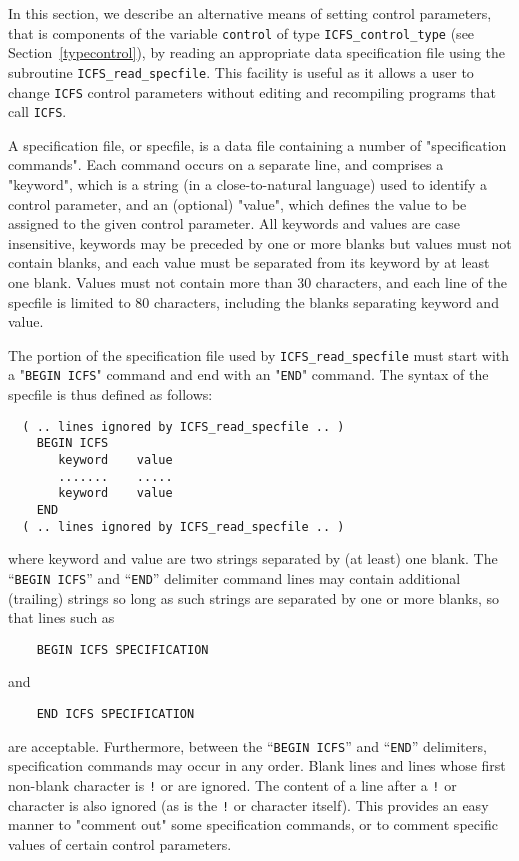 \documentclass{galahad}
\newcommand{\packagename}{ICFS}
\begin{document}

\galfeatures
\noindent In this section, we describe an alternative means of setting 
control parameters, that is components of the variable {\tt control} of type
{\tt \packagename\_control\_type}
(see Section~\ref{typecontrol}), 
by reading an appropriate data specification file using the
subroutine {\tt \packagename\_read\_specfile}. This facility
is useful as it allows a user to change  {\tt \packagename} control parameters 
without editing and recompiling programs that call {\tt \packagename}.

A specification file, or specfile, is a data file containing a number of 
"specification commands". Each command occurs on a separate line, 
and comprises a "keyword", 
which is a string (in a close-to-natural language) used to identify a 
control parameter, and 
an (optional) "value", which defines the value to be assigned to the given
control parameter. All keywords and values are case insensitive, 
keywords may be preceded by one or more blanks but
values must not contain blanks, and
each value must be separated from its keyword by at least one blank.
Values must not contain more than 30 characters, and 
each line of the specfile is limited to 80 characters,
including the blanks separating keyword and value.

The portion of the specification file used by 
{\tt \packagename\_read\_specfile}
must start
with a "{\tt BEGIN \packagename}" command and end with an 
"{\tt END}" command.  The syntax of the specfile is thus defined as follows:
\begin{verbatim}
  ( .. lines ignored by ICFS_read_specfile .. )
    BEGIN ICFS
       keyword    value
       .......    .....
       keyword    value
    END 
  ( .. lines ignored by ICFS_read_specfile .. )
\end{verbatim}
where keyword and value are two strings separated by (at least) one blank.
The ``{\tt BEGIN \packagename}'' and ``{\tt END}'' delimiter command lines 
may contain additional (trailing) strings so long as such strings are 
separated by one or more blanks, so that lines such as
\begin{verbatim}
    BEGIN ICFS SPECIFICATION
\end{verbatim}
and
\begin{verbatim}
    END ICFS SPECIFICATION
\end{verbatim}
are acceptable. Furthermore, 
between the
``{\tt BEGIN \packagename}'' and ``{\tt END}'' delimiters,
specification commands may occur in any order.  Blank lines and
lines whose first non-blank character is {\tt !} or {\tt *} are ignored. 
The content 
of a line after a {\tt !} or {\tt *} character is also 
ignored (as is the {\tt !} or {\tt *}
character itself). This provides an easy manner to "comment out" some 
specification commands, or to comment specific values 
of certain control parameters.  
\end{document}

